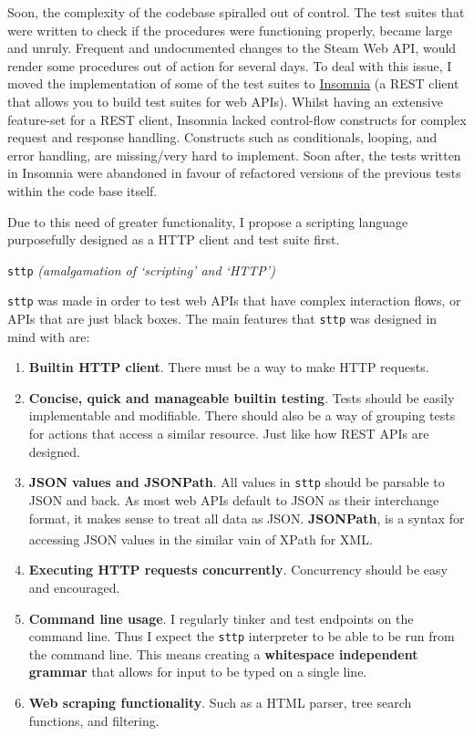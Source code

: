 \documentclass[]{full}
\theoremstyle{definition}
\begin{document}
Soon, the complexity of the codebase spiralled out of control. The test suites that were written to check if the procedures were functioning properly, became large and unruly. Frequent and undocumented changes to the Steam Web API, would render some procedures out of action for several days. To deal with this issue, I moved the implementation of some of the test suites to \href{https://insomnia.rest/}{Insomnia} (a REST client that allows you to build test suites for web APIs). Whilst having an extensive feature-set for a REST client, Insomnia lacked control-flow constructs for complex request and response handling. Constructs such as conditionals, looping, and error handling, are missing/very hard to implement. Soon after, the tests written in Insomnia were abandoned in favour of refactored versions of the previous tests within the code base itself.

Due to this need of greater functionality, I propose a scripting language purposefully designed as a HTTP client and test suite first.

\begin{center}
\verb|sttp| \textit{(amalgamation of `scripting' and `HTTP')}
\end{center}

\verb|sttp| was made in order to test web APIs that have complex interaction flows, or APIs that are just black boxes. The main features that \verb|sttp| was designed in mind with are:

\begin{enumerate}
    \item \textbf{Builtin HTTP client}. There must be a way to make HTTP requests.
    \item \textbf{Concise, quick and manageable builtin testing}. Tests should be easily implementable and modifiable. There should also be a way of grouping tests for actions that access a similar resource. Just like how REST APIs are designed.
    \item \textbf{JSON values and JSONPath}. All values in \verb|sttp| should be parsable to JSON and back. As most web APIs default to JSON as their interchange format, it makes sense to treat all data as JSON. \textbf{JSONPath}, is a syntax for accessing JSON values in the similar vain of XPath for XML\textsuperscript{\cite{goessner_2007}}.
    \item \textbf{Executing HTTP requests concurrently}. Concurrency should be easy and encouraged.
    \item \textbf{Command line usage}. I regularly tinker and test endpoints on the command line. Thus I expect the \verb|sttp| interpreter to be able to be run from the command line. This means creating a \textbf{whitespace independent grammar} that allows for input to be typed on a single line.
    \item \textbf{Web scraping functionality}. Such as a HTML parser, tree search functions, and filtering.
\end{enumerate}
\end{document}
